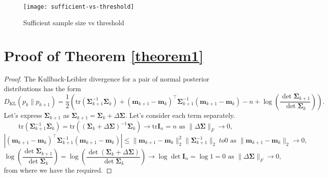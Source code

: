 \documentclass[runningheads]{llncs}
\begin{document}
\begin{figure}[ht]
    \centering
    \texttt{[image: sufficient-vs-threshold]}
    \caption{Sufficient sample size vs threshold}
    \label{sufficient-vs-threshold}
\end{figure}

%
%
%
\clearpage


%

\clearpage
\appendix

\section{Proof of Theorem \ref{theorem1}}
\begin{proof}
The Kullback-Leibler divergence for a pair of normal posterior distributions has the form
    \[ D_{\text{KL}}\left( p_k \| p_{k+1} \right) = \dfrac{1}{2} \left( \mathrm{tr}\left( \mathbf{\Sigma}_{k+1}^{-1} \mathbf{\Sigma}_k \right) + (\mathbf{m}_{k+1} - \mathbf{m}_k)^{\top} \mathbf{\Sigma}_{k+1}^{-1} (\mathbf{m}_{k+1} - \mathbf{m}_k) - n + \log{\left( \dfrac{\det \mathbf{\Sigma}_{k+1}}{\det \mathbf{\Sigma}_{k}} \right)} \right). \]
    Let's express $\mathbf{\Sigma}_{k+1}$ as $\mathbf{\Sigma}_{k+1} = \mathbf{\Sigma}_k + \Delta\mathbf{\Sigma}$. Let's consider each term separately.
    \[ \mathrm{tr}\left( \mathbf{\Sigma}_{k+1}^{-1} \mathbf{\Sigma}_k \right) = \mathrm{tr}\left(\left(\mathbf{\Sigma}_k + \Delta \mathbf{\Sigma} \right)^{-1} \mathbf{\Sigma}_k \right) \to \mathrm{tr}\mathbf{I}_n=n\text{ as } \| \Delta \mathbf{\Sigma} \|_F \to 0, \]
    \[ \left| (\mathbf{m}_{k+1} - \mathbf{m}_k)^{\top}\mathbf{\Sigma}_{k+1}^{-1} (\mathbf{m}_{k+1} - \mathbf{m}_k) \right| \leqslant\| \mathbf{m}_{k+1} -\mathbf{m}_k\|_2^2\|\mathbf{\Sigma}_{k+1}^{-1} \|_2 \ to 0 \text{ as } \| \mathbf{m}_{k+1} - \mathbf{m}_k\|_2 \to 0, \]
    \[ \log{\left( \dfrac{\det \mathbf{\Sigma}_{k+1}}{\det \mathbf{\Sigma}_{k}} \right)} = \log{\left( \dfrac{\det \left( \mathbf{\Sigma}_k + \Delta \mathbf{\Sigma} \right)}{\det\mathbf{\Sigma}_{k}} \right)} \to \log \det\mathbf{I}_n = \log 1 = 0 \text{ as } \| \Delta \mathbf{\Sigma} \|_F\to 0, \]
    from where we have the required.
\end{proof}
\end{document}
